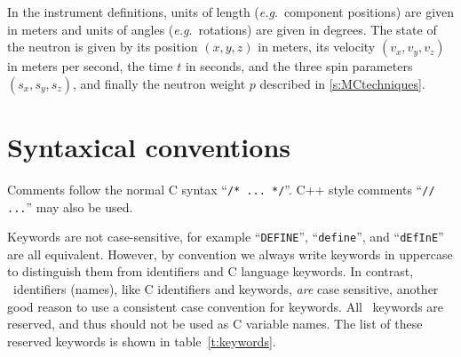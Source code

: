 In the instrument definitions, units of length (\textit{e.g}.\ component
positions) are given in meters and units of angles (\textit{e.g}.\
rotations) are given in degrees.  The state of the neutron is given by
its position $(x,y,z)$ in meters, its velocity $(v_x, v_y, v_z)$ in
meters per second, the time $t$ in seconds, and the three spin parameters
$\left( s_x, s_y, s_z \right)$, and finally the neutron weight $p$ described in \ref{s:MCtechniques}.

\section{Syntaxical conventions}
\label{s:syntax}

Comments follow the normal C syntax ``\verb+/* ... */+''. C++ style
comments ``\verb+// ...+'' may also be used.


Keywords are not case-sensitive, for example ``\verb+DEFINE+'',
``\verb+define+'', and ``\verb+dEfInE+'' are all equivalent. However, by
convention we always write keywords in uppercase to distinguish them
from identifiers and C language keywords. In contrast, \MCS\
identifiers (names), like C identifiers and keywords, \emph{are} case
sensitive, another good reason to use a consistent case convention for
keywords. All \MCS\ keywords are reserved, and thus should not be used
as C variable names. The list of these reserved keywords is shown in table~\ref{t:keywords}. 

